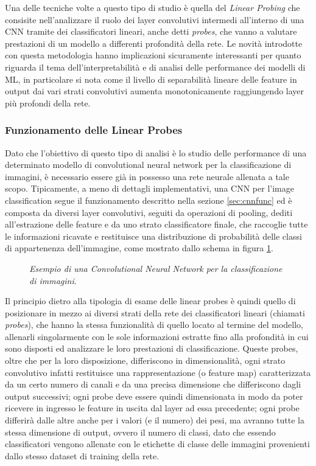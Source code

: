 Una delle tecniche volte a questo tipo di studio è quella del \textit{Linear Probing} \cite{linearprobes} che consisite nell'analizzare il ruolo dei layer convolutivi intermedi all'interno di una CNN tramite dei classificatori lineari, anche detti \textit{probes}, che vanno a valutare prestazioni di un modello a differenti profondità della rete. Le novità introdotte con questa metodologia hanno implicazioni sicuramente interessanti per quanto riguarda il tema dell'interpretabilità e di analisi delle performance dei modelli di ML, in particolare si nota come il livello di separabilità lineare delle feature in output dai vari strati convolutivi aumenta monotonicamente raggiungendo layer più profondi della rete.

\subsubsection{Funzionamento delle Linear Probes}

Dato che l'obiettivo di questo tipo di analisi è lo studio delle performance di una determinato modello di convolutional neural network per la classificazione di immagini, è necessario essere già in possesso una rete neurale allenata a tale scopo. Tipicamente, a meno di dettagli implementativi, una CNN per l'image classification segue il funzionamento descritto nella sezione \ref{sec:cnnfunc} ed è composta da diversi layer convolutivi, seguiti da operazioni di pooling, dediti all'estrazione delle feature e da uno strato classificatore finale, che raccoglie tutte le informazioni ricavate e restituisce una distribuzione di probabilità delle classi di appartenenza dell'immagine, come mostrato dallo schema in figura \ref{fig:cnn}. 

\begin{figure}[ht!]
    \centering
    \caption{\textit{Esempio di una Convolutional Neural Network per la classificazione di immagini}.}
    \label{fig:cnn}
\end{figure}

Il principio dietro alla tipologia di esame delle linear probes è quindi quello di posizionare in mezzo ai diversi strati della rete dei classificatori lineari (chiamati \textit{probes}), che hanno la stessa funzionalità di quello locato al termine del modello, allenarli singolarmente con le sole informazioni estratte fino alla profondità in cui sono disposti ed analizzare le loro prestazioni di classificazione. Queste probes, oltre che per la loro disposizione, differiscono in dimensionalità, ogni strato convolutivo infatti restituisce una rappresentazione (o feature map) caratterizzata da un certo numero di canali e da una precisa dimensione che differiscono dagli output successivi; ogni probe deve essere quindi dimensionata in modo da poter ricevere in ingresso le feature in uscita dal layer ad essa precedente; ogni probe differirà dalle altre anche per i valori (e il numero) dei pesi, ma avranno tutte la stessa dimensione di output, ovvero il numero di classi, dato che essendo classificatori vengono allenate con le etichette di classe delle immagini provenienti dallo stesso dataset di training della rete.

